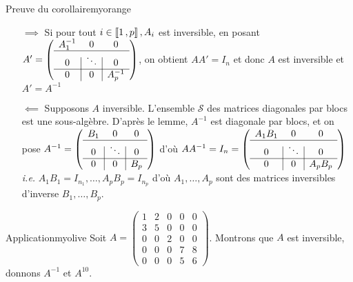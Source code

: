     \begin{demo}{Preuve du corollaire}{myorange}
        \begin{itemize}
            \item[\textcolor{myorange}{$\implies$}] Si pour tout $i \in \left\llbracket 1 \, , p \right\rrbracket, A_i$ est inversible, en posant $A' = \left( \begin{array}{c | c | c}
                A_1^{-1} & 0 & 0 \\
                \hline 
                0 & \ddots & 0 \\
                \hline 
                0 & 0 & A_p^{-1} 
            \end{array} \right)$, on obtient $AA' = I_n$ et donc $A$ est inversible et $A' = A^{-1}$
            \item[\textcolor{myorange}{$\impliedby$}] Supposons $A$ inversible. L’ensemble $\mathcal{S}$ des matrices diagonales par blocs est une sous-algèbre. D’après le lemme, $A^{-1}$ est diagonale par blocs, et on pose $A^{-1} = \left( \begin{array}{c | c | c}
                B_1 & 0 & 0 \\
                \hline 
                0 & \ddots & 0 \\
                \hline 
                0 & 0 & B_p 
            \end{array} \right)$ d’où $AA^{-1} = I_n = \left( \begin{array}{c | c | c}
                A_1 B_1 & 0 & 0 \\
                \hline 
                0 & \ddots & 0 \\
                \hline 
                0 & 0 & A_p B_p 
            \end{array} \right)$ \textit{i.e.} $A_1 B_1 = I_{n_1}, \ldots, A_p B_p = I_{n_p}$ d’où $A_1, \ldots, A_p$ sont des matrices inversibles d’inverse $B_1, \ldots, B_p$.
        \end{itemize}
    \end{demo}

    \begin{omed}{Application}{myolive}
        Soit $A = \begin{pmatrix}
            1 & 2 & 0 & 0 & 0 \\
            3 & 5 & 0 & 0 & 0 \\
            0 & 0 & 2 & 0 & 0 \\
            0 & 0 & 0 & 7 & 8 \\
            0 & 0 & 0 & 5 & 6
        \end{pmatrix}$. Montrons que $A$ est inversible, donnons $A^{-1}$ et $A^{10}$.
    \end{omed}
    
